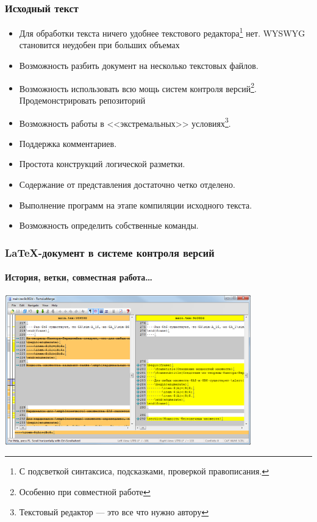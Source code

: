 \begin{frame}
\frametitle{Исходный \alert{текст}}
    \begin{itemize}
        \item Для обработки текста ничего удобнее текстового редактора\footnote{С подсветкой синтаксиса, подсказками, проверкой правописания.} нет.
         {WYSWYG становится неудобен при больших объемах}
        
        \item Возможность разбить документ на несколько текстовых файлов.
        
        \item Возможность использовать всю мощь систем контроля версий\footnote{Особенно при совместной работе}.
         {Продемонстрировать репозиторий}
        
        \item Возможность работы в <<экстремальных>> условиях\footnote{Текстовый редактор --- это все что нужно автору}.
        
        \item Поддержка комментариев.
        
        \item Простота конструкций логической разметки.
        
        \item Содержание от представления достаточно четко отделено.
        
        \item Выполнение программ на этапе компиляции исходного текста.
        
        \item Возможность определить собственные команды.
        
    \end{itemize}
\end{frame}

\begin{frame}
    \frametitle{\LaTeX-документ в системе контроля версий}
    \framesubtitle{История, ветки, совместная работа\ldots}
    
    \begin{center}
        \includegraphics[width=0.8\textwidth]{pict/git}
    \end{center}
\end{frame}


